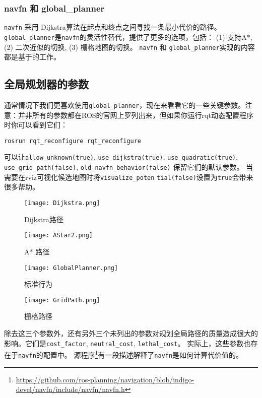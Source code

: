 \subsubsection[navfn and global\_planner]{navfn 和 global\_planner}

\texttt{navfn} 采用 Dijkstra算法在起点和终点之间寻找一条最小代价的路径。
\texttt{global_planner}是\texttt{navfn}的灵活性替代，提供了更多的选项，包括：
(1) 支持A$*$, (2) 二次近似的切换, (3) 栅格地图的切换。
\texttt{navfn} 和 \texttt{global_planner}实现的内容都是基于\cite{brock1999high}的工作。

\subsection[Global Planner Parameters]{全局规划器的参数}

通常情况下我们更喜欢使用\texttt{global_planner}，现在来看看它的一些关键参数。注意：并非所有的参数都在ROS的官网上罗列出来，但如果你运行rqt动态配置程序时你可以看到它们：
\begin{verbatim}
rosrun rqt_reconfigure rqt_reconfigure
\end{verbatim}
可以让\texttt{allow_unknown(true)}, \texttt{use_dijkstra(true)},  \texttt{use_quadratic(true)},  \texttt{use_grid_path(false)},  \texttt{old_navfn_behavior(false)} 保留它们的默认参数。
当需要在rviz可视化候选地图时将\texttt{visualize_poten} \texttt{tial(false)}设置为\texttt{true}会带来很多帮助。

\begin{figure}[!htb]
	\texttt{[image: Dijkstra.png]}
	\caption{Dijkstra路径}
	\endminipage\hfill
	\texttt{[image: AStar2.png]}
	\caption{A* 路径}
	\endminipage\hfill
\end{figure}

\begin{figure}[!htb]
	\texttt{[image: GlobalPlanner.png]}
	\caption{标准行为}
	\endminipage\hfill
	\texttt{[image: GridPath.png]}
	\caption{栅格路径}
	\endminipage\hfill
\end{figure}

除去这三个参数外，还有另外三个未列出的参数对规划全局路径的质量造成很大的影响。它们是\texttt{cost_factor}, \texttt{neutral_cost}, \texttt{lethal_cost}。
实际上，这些参数也存在于\texttt{navfn}的配置中。
源程序\footnote{\scriptsize\url{https://github.com/ros-planning/navigation/blob/indigo-devel/navfn/include/navfn/navfn.h}}有一段描述解释了\texttt{navfn}是如何计算代价值的。

